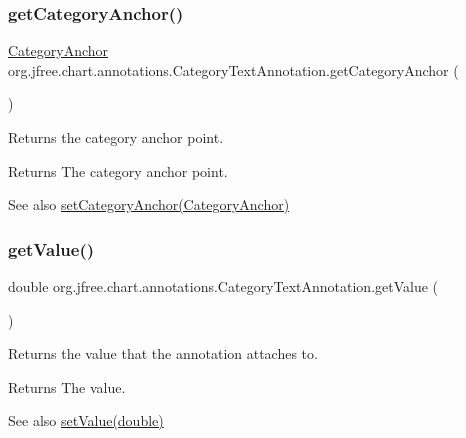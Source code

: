 \subsubsection{\texorpdfstring{get\+Category\+Anchor()}{getCategoryAnchor()}}
{\footnotesize\ttfamily \mbox{\hyperlink{classorg_1_1jfree_1_1chart_1_1axis_1_1_category_anchor}{Category\+Anchor}} org.\+jfree.\+chart.\+annotations.\+Category\+Text\+Annotation.\+get\+Category\+Anchor (\begin{DoxyParamCaption}{ }\end{DoxyParamCaption})}

Returns the category anchor point.

\begin{DoxyReturn}{Returns}
The category anchor point.
\end{DoxyReturn}
\begin{DoxySeeAlso}{See also}
\mbox{\hyperlink{classorg_1_1jfree_1_1chart_1_1annotations_1_1_category_text_annotation_afa9fb6f9815586605a76cb6f339a0c57}{set\+Category\+Anchor(\+Category\+Anchor)}} 
\end{DoxySeeAlso}
\mbox{\label{classorg_1_1jfree_1_1chart_1_1annotations_1_1_category_text_annotation_ac041de5a5281948b0bd12e2442a9d248}} 
\subsubsection{\texorpdfstring{get\+Value()}{getValue()}}
{\footnotesize\ttfamily double org.\+jfree.\+chart.\+annotations.\+Category\+Text\+Annotation.\+get\+Value (\begin{DoxyParamCaption}{ }\end{DoxyParamCaption})}

Returns the value that the annotation attaches to.

\begin{DoxyReturn}{Returns}
The value.
\end{DoxyReturn}
\begin{DoxySeeAlso}{See also}
\mbox{\hyperlink{classorg_1_1jfree_1_1chart_1_1annotations_1_1_category_text_annotation_afded63ce4398edd0bf3a20324eef26f7}{set\+Value(double)}} 
\end{DoxySeeAlso}
\mbox{\label{classorg_1_1jfree_1_1chart_1_1annotations_1_1_category_text_annotation_a210b1b3097158108ee88085e8f546315}} 
